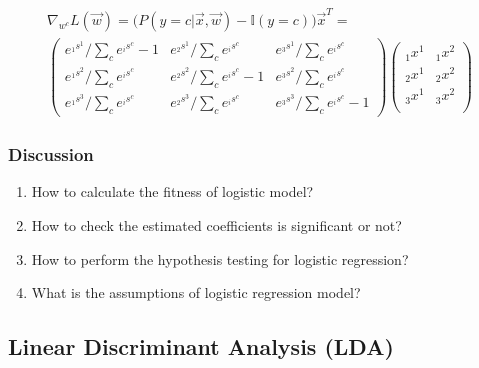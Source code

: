 \documentclass[12pt,a4paper]{article}%
\theoremstyle{definition}
\theoremstyle{plain}
\numberwithin{equation}{section}
\begin{document}
\begin{gather}
\nabla_{ w^{c} } L(\vec{w})  =  \big(  P( y = c |  \vec{x}, \vec{w})  - \mathbb{I}(y=c)   \big)  \vec{x} ^{T}= \\
\begin{pmatrix}
e^{{}_1s^{1}} /\sum\limits_{c} e^{{}_is^{c}} -1 &  e^{{}_2s^{1}}  /\sum\limits_{c} e^{{}_is^{c}}    &  e^{{}_3s^{1}}  /\sum\limits_{c} e^{{}_is^{c}} \\
e^{{}_1s^{2}} /\sum\limits_{c} e^{{}_is^{c}} & e^{{}_2s^{2}} /\sum\limits_{c} e^{{}_is^{c}}  -1  & e^{{}_3s^{2}} /\sum\limits_{c} e^{{}_is^{c}} \\
e^{{}_1s^{3}} /\sum\limits_{c} e^{{}_is^{c}} & e^{{}_2s^{3}}   /\sum\limits_{c} e^{{}_is^{c}}   & e^{{}_3s^{3}}   /\sum\limits_{c} e^{{}_is^{c}} -1
\end{pmatrix} \begin{pmatrix}
{}_1x^{1}    & {}_1x^{2}  \\
 {}_2x^{1}   & {}_2x^{2}   \\
{}_3x^{1}    &  {}_3x^{2} \\
\end{pmatrix} 
\end{gather} 

\subsubsection{Discussion}
\begin{enumerate}
\item How to calculate the fitness of logistic model?
\item How to check the estimated coefficients is significant or not?
\item How to perform the hypothesis testing for logistic regression? 
\item What is the assumptions of logistic regression model?
\end{enumerate}

\subsection{\textbf{Linear Discriminant Analysis (LDA)}}
\end{document}
